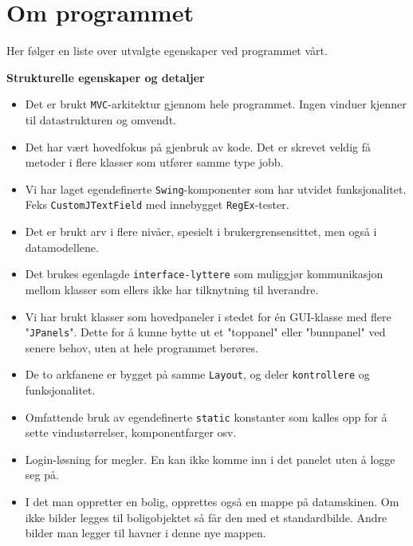 \chapter*{Om programmet}
Her følger en liste over utvalgte egenskaper ved programmet vårt.

\textbf{Strukturelle egenskaper og detaljer}

\begin{itemize}[noitemsep,nolistsep]
\item Det er brukt \texttt{MVC}-arkitektur gjennom hele programmet. Ingen vinduer kjenner til datastrukturen og omvendt. \\
\item Det har vært hovedfokus på gjenbruk av kode. Det er skrevet veldig få metoder i flere klasser som utfører samme type jobb. \\
\item Vi har laget egendefinerte \texttt{Swing}-komponenter som har utvidet funksjonalitet. Feks \texttt{CustomJTextField} med innebygget \texttt{RegEx}-tester. \\
\item Det er brukt arv i flere nivåer, spesielt i brukergrensensittet, men også i datamodellene. \\
\item Det brukes egenlagde \texttt{interface-lyttere} som muliggjør kommunikasjon mellom klasser som ellers ikke har tilknytning til hverandre. \\
\item Vi har brukt klasser som hovedpaneler i stedet for én GUI-klasse med flere "\texttt{JPanels}". Dette for å kunne bytte ut et "toppanel" eller "bunnpanel" ved senere behov, uten at hele programmet berøres. \\
\item De to arkfanene er bygget på samme \texttt{Layout}, og deler \texttt{kontrollere} og funksjonalitet. \\
\item Omfattende bruk av egendefinerte \texttt{static} konstanter som kalles opp for å sette vindustørrelser, komponentfarger osv. \\
\item Login-løsning for megler. En kan ikke komme inn i det panelet uten å logge seg på. \\
\item I det man oppretter en bolig, opprettes også en mappe på datamskinen. Om ikke bilder legges til boligobjektet så får den med et standardbilde. Andre bilder man legger til havner i denne nye mappen.\\\\
\end{itemize}


